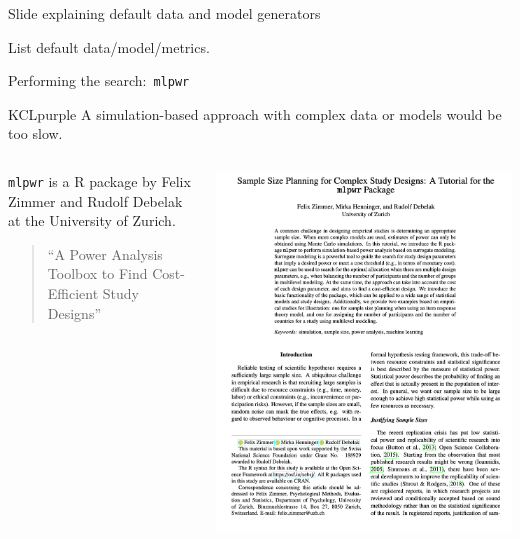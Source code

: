 \documentclass[11pt]{beamer}
\begin{document}
\begin{frame}[t]{Slide explaining default data and model generators}

    List default data/model/metrics.

\end{frame}

\begin{frame}{Performing the search:\ \texttt{mlpwr}}

	\begin{cbox}{KCLpurple}{}
		A simulation-based approach with complex data or models would be too
		slow.
	\end{cbox}

	\begin{columns}
		\begin{column}[c]{0.5\textwidth}
			\texttt{mlpwr} is a R package by Felix Zimmer and Rudolf Debelak at
			the University of Zurich.
			\begin{quote}
				``A Power Analysis Toolbox to Find Cost-Efficient Study Designs''
			\end{quote}
		\end{column}
		\begin{column}[c]{0.5\textwidth}
			\includegraphics[width=\textwidth]{figures/mlpwr_paper.png}
		\end{column}
	\end{columns}

\end{frame}
\end{document}
